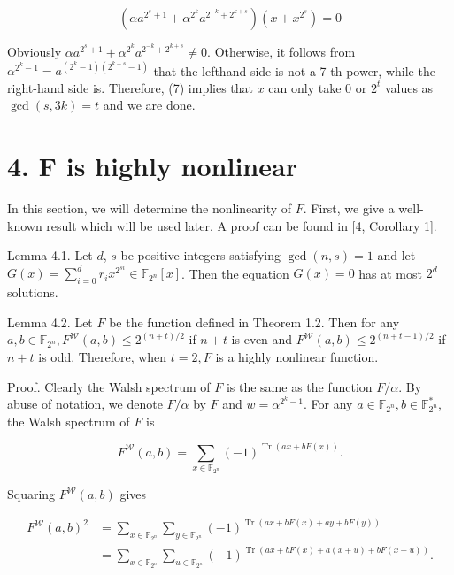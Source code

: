 \documentclass[10pt]{article}
\begin{document}
\begin{equation*}
\left(\alpha a^{2^{s}+1}+\alpha^{2^{k}} a^{2^{-k}+2^{k+s}}\right)\left(x+x^{2^{s}}\right)=0 \tag{7}
\end{equation*}


Obviously $\alpha a^{2^{s}+1}+\alpha^{2^{k}} a^{2^{-k}+2^{k+s}} \neq 0$. Otherwise, it follows from $\alpha^{2^{k}-1}=a^{\left(2^{k}-1\right)\left(2^{k+s}-1\right)}$ that the lefthand side is not a 7-th power, while the right-hand side is. Therefore, (7) implies that $x$ can only take 0 or $2^{t}$ values as $\operatorname{gcd}(s, 3 k)=t$ and we are done.

\section*{4. F is highly nonlinear}
In this section, we will determine the nonlinearity of $F$. First, we give a well-known result which will be used later. A proof can be found in [4, Corollary 1].

Lemma 4.1. Let $d$, $s$ be positive integers satisfying $\operatorname{gcd}(n, s)=1$ and let $G(x)=\sum_{i=0}^{d} r_{i} x^{2^{s i}} \in \mathbb{F}_{2^{n}}[x]$. Then the equation $G(x)=0$ has at most $2^{d}$ solutions.

Lemma 4.2. Let $F$ be the function defined in Theorem 1.2. Then for any $a, b \in \mathbb{F}_{2^{n}}, F^{\mathcal{W}}(a, b) \leqslant 2^{(n+t) / 2}$ if $n+t$ is even and $F^{\mathcal{W}}(a, b) \leqslant 2^{(n+t-1) / 2}$ if $n+t$ is odd. Therefore, when $t=2, F$ is a highly nonlinear function.

Proof. Clearly the Walsh spectrum of $F$ is the same as the function $F / \alpha$. By abuse of notation, we denote $F / \alpha$ by $F$ and $w=\alpha^{2^{k}-1}$. For any $a \in \mathbb{F}_{2^{n}}, b \in \mathbb{F}_{2^{n}}^{*}$, the Walsh spectrum of $F$ is

$$
F^{\mathcal{W}}(a, b)=\sum_{x \in \mathbb{F}_{2^{n}}}(-1)^{\operatorname{Tr}(a x+b F(x))} .
$$

Squaring $F^{\mathcal{W}}(a, b)$ gives

$$
\begin{aligned}
F^{\mathcal{W}}(a, b)^{2} & =\sum_{x \in \mathbb{F}_{2^{n}}} \sum_{y \in \mathbb{F}_{2^{n}}}(-1)^{\operatorname{Tr}(a x+b F(x)+a y+b F(y))} \\
& =\sum_{x \in \mathbb{F}_{2^{n}}} \sum_{u \in \mathbb{F}_{2^{n}}}(-1)^{\operatorname{Tr}(a x+b F(x)+a(x+u)+b F(x+u))} .
\end{aligned}
$$
\end{document}
